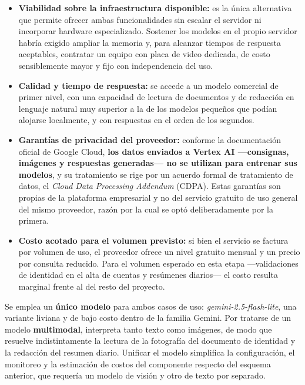 \documentclass[a4paper,12pt]{article}
\begin{document}
    \begin{itemize}
        \item \textbf{Viabilidad sobre la infraestructura disponible:} es la única alternativa que permite ofrecer ambas funcionalidades sin escalar el servidor ni incorporar hardware especializado. Sostener los modelos en el propio servidor habría exigido ampliar la memoria y, para alcanzar tiempos de respuesta aceptables, contratar un equipo con placa de video dedicada, de costo sensiblemente mayor y fijo con independencia del uso.
        \item \textbf{Calidad y tiempo de respuesta:} se accede a un modelo comercial de primer nivel, con una capacidad de lectura de documentos y de redacción en lenguaje natural muy superior a la de los modelos pequeños que podían alojarse localmente, y con respuestas en el orden de los segundos.
        \item \textbf{Garantías de privacidad del proveedor:} conforme la documentación oficial de Google Cloud, \textbf{los datos enviados a Vertex AI —consignas, imágenes y respuestas generadas— no se utilizan para entrenar sus modelos}, y su tratamiento se rige por un acuerdo formal de tratamiento de datos, el \textit{Cloud Data Processing Addendum} (CDPA)\cite{GoogleCloudDataGovernance}. Estas garantías son propias de la plataforma empresarial y no del servicio gratuito de uso general del mismo proveedor, razón por la cual se optó deliberadamente por la primera.
        \item \textbf{Costo acotado para el volumen previsto:} si bien el servicio se factura por volumen de uso, el proveedor ofrece un nivel gratuito mensual y un precio por consulta reducido. Para el volumen esperado en esta etapa —validaciones de identidad en el alta de cuentas y resúmenes diarios— el costo resulta marginal frente al del resto del proyecto.
    \end{itemize}
    \par Se emplea un \textbf{único modelo} para ambos casos de uso: \textit{gemini-2.5-flash-lite}, una variante liviana y de bajo costo dentro de la familia Gemini. Por tratarse de un modelo \textbf{multimodal}, interpreta tanto texto como imágenes, de modo que resuelve indistintamente la lectura de la fotografía del documento de identidad y la redacción del resumen diario. Unificar el modelo simplifica la configuración, el monitoreo y la estimación de costos del componente respecto del esquema anterior, que requería un modelo de visión y otro de texto por separado.
\end{document}
